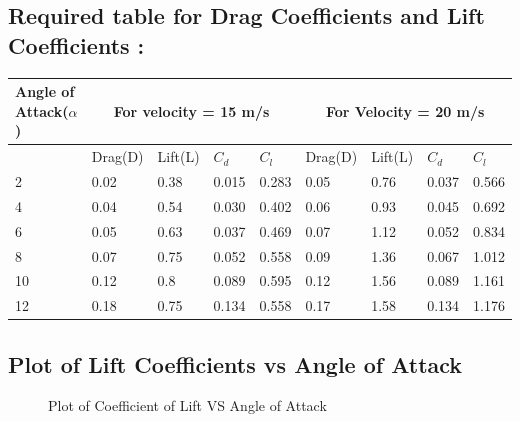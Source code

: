 \documentclass[12pt,a4paper]{article}
\begin{document}
\subsection{Required table for Drag Coefficients and Lift Coefficients :}
\begin{table}[ht]
\centering
\vspace{2mm}
\begin{tabular}{|p{15mm}|p{15mm}|p{15mm}|p{15mm}|p{15mm}|p{15mm}|p{15mm}|p{15mm}|p{15mm}|} 
 \hline
Angle of Attack($\alpha$) & \multicolumn{4}{|c|}{For velocity = 15 m/s} & \multicolumn{4}{|c|}{For Velocity = 20 m/s} \\ 
 \hline
  & Drag(D) & Lift(L) & $C_d$ & $C_l$ & Drag(D) & Lift(L) & $C_d$ & $C_l$ \\
 \hline
2 & 0.02 & 0.38  & 0.015 & 0.283 & 0.05 & 0.76 & 0.037 & 0.566\\ 
 \hline
 4 & 0.04 & 0.54 & 0.030 & 0.402 & 0.06 & 0.93 & 0.045 & 0.692 \\
 \hline
6 & 0.05 & 0.63 & 0.037 & 0.469 & 0.07 & 1.12 & 0.052 & 0.834  \\
 \hline
 8 & 0.07 & 0.75 & 0.052 & 0.558 & 0.09 & 1.36 & 0.067 & 1.012  \\
 \hline
10 & 0.12 & 0.8 & 0.089 & 0.595 & 0.12 & 1.56 & 0.089 & 1.161 \\
 \hline
12 & 0.18 & 0.75 & 0.134 & 0.558 & 0.17 & 1.58 & 0.134 & 1.176\\ 
 \hline
 \end{tabular}
\end{table}
\subsection{Plot of Lift Coefficients vs Angle of Attack}
\begin{figure}[!ht]
	\begin{center}
	\end{center}
	\caption{Plot of Coefficient of Lift VS Angle of Attack}
\end{figure}
\end{document}
